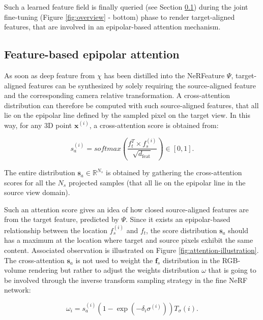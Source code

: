  Such a learned feature field is finally queried (see Section \ref{subsec:epipolar_att}) during the joint fine-tuning (Figure \ref{fig:overview} - bottom) phase to render target-aligned features, that are involved in an epipolar-based attention mechanism. 
 
\subsection{Feature-based epipolar attention}
\label{subsec:epipolar_att}

As soon as deep feature from $\chi$ has been distilled into the NeRFeature $\Psi$, target-aligned features can be synthesized by solely requiring the source-aligned feature and the corresponding camera relative transformation. A cross-attention distribution \citep{vaswani2017attention} can therefore be computed with such source-aligned features, that all lie on the epipolar line defined by the sampled pixel on the target view. In this way, for any 3D point $\mathbf{x}^{(i)}$, a cross-attention score is obtained from: 

\begin{equation}
    s_{a}^{(i)} = softmax\left(\frac{f_{t}^{T}\times f_{s}^{(i)}}{\sqrt{d_{\text{feat}}}}\right) \in [0,1].
\label{eq:attention}
\end{equation}

The entire distribution $\textbf{s}_{a} \in \mathbb{R}^{N_{s}}$ is obtained by gathering the cross-attention scores for all the $N_s$ projected samples (that all lie on the epipolar line in the source view domain). 

Such an attention score gives an idea of how closed source-aligned features are from the target feature, predicted by $\Psi$. Since it exists an epipolar-based relationship between the location $f_{s}^{(i)}$ and $f_{t}$, the score distribution $\mathbf{s}_{a}$ should has a maximum at the location where target and source pixels exhibit the same content. Associated observation is illustrated on Figure \ref{fig:attention-illustration}. The cross-attention $\mathbf{s}_{a}$ is not used to weight the $\mathbf{f}_{s}$ distribution in the RGB-volume rendering \citep{max1995optical} but rather to adjust the weights distribution $\omega$ that is going to be involved through the inverse transform sampling strategy \citep{mildenhall2020nerf} in the fine NeRF network: 

\begin{equation}
    \omega_{i} = s_{a}^{(i)} \left(1 - \exp(-\delta_{i}\sigma^{(i)})\right)T_{\sigma}(i).
\end{equation}


